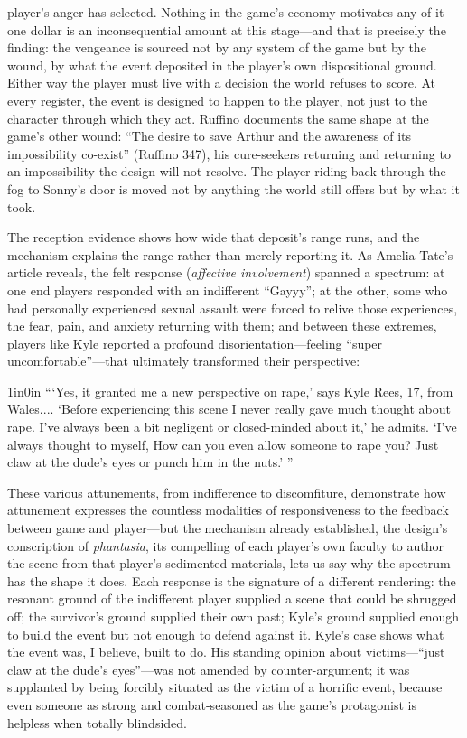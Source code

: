 \documentclass{article}
\begin{document}
player's anger has selected. Nothing in the game's economy motivates any of it---one dollar is an inconsequential amount at this stage---and that is precisely the finding: the vengeance is sourced not by any system of the game but by the wound, by what the event deposited in the player's own dispositional ground. Either way the player must live with a decision the world refuses to score. At every register, the event is designed to happen to the player, not just to the character through which they act.
Ruffino documents the same shape at the game's other wound: ``The desire to save Arthur and the awareness of its impossibility co-exist'' (Ruffino 347), his cure-seekers returning and returning to an impossibility the design will not resolve. The player riding back through the fog to Sonny's door is moved not by anything the world still offers but by what it took.

The reception evidence shows how wide that deposit's range runs, and the mechanism explains the range rather than merely reporting it. As Amelia Tate's article reveals, the felt response (\textit{affective involvement}) spanned a spectrum: at one end players responded with an indifferent ``Gayyy''; at the other, some who had personally experienced sexual assault were forced to relive those experiences, the fear, pain, and anxiety returning with them; and between these extremes, players like Kyle reported a profound disorientation---feeling ``super uncomfortable''---that ultimately transformed their perspective:

\begin{adjustwidth}{1in}{0in}
```Yes, it granted me a new perspective on rape,' says Kyle Rees, 17, from Wales.... `Before experiencing this scene I never really gave much thought about rape. I've always been a bit negligent or closed-minded about it,' he admits. `I've always thought to myself, How can you even allow someone to rape you? Just claw at the dude's eyes or punch him in the nuts.' ''
\end{adjustwidth}

These various attunements, from indifference to discomfiture, demonstrate how attunement expresses the countless modalities of responsiveness to the feedback between game and player---but the mechanism already established, the design's conscription of \textit{phantasia}, its compelling of each player's own faculty to author the scene from that player's sedimented materials, lets us say why the spectrum has the shape it does. Each response is the signature of a different rendering: the resonant ground of the indifferent player supplied a scene that could be shrugged off; the survivor's ground supplied their own past; Kyle's ground supplied enough to build the event but not enough to defend against it. Kyle's case shows what the event was, I believe, built to do. His standing opinion about victims---``just claw at the dude's eyes''---was not amended by counter-argument; it was supplanted by being forcibly situated as the victim of a horrific event, because even someone as strong and combat-seasoned as the game's protagonist is helpless when totally blindsided.
\end{document}
